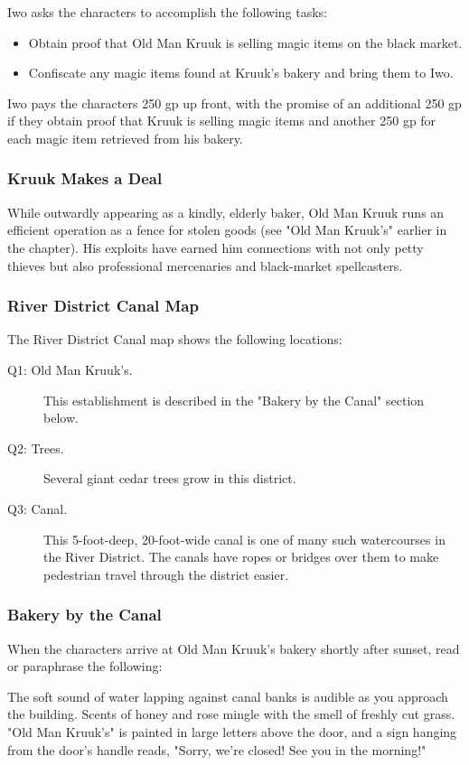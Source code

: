 \documentclass[10pt,a4paper,twoside,bg=print,twocolumn,openany,nodeprecatedcode]{dndbook}
\begin{document}
Iwo asks the characters to accomplish the following tasks:


\begin{itemize}
\item Obtain proof that Old Man Kruuk is selling magic items on the black market.
\item Confiscate any magic items found at Kruuk's bakery and bring them to Iwo.
\end{itemize}

Iwo pays the characters 250 gp up front, with the promise of an additional 250 gp if they obtain proof that Kruuk is selling magic items and another 250 gp for each magic item retrieved from his bakery.

\subsubsection{Kruuk Makes a Deal}
While outwardly appearing as a kindly, elderly baker, Old Man Kruuk runs an efficient operation as a fence for stolen goods (see "Old Man Kruuk's" earlier in the chapter). His exploits have earned him connections with not only petty thieves but also professional mercenaries and black-market spellcasters.

\subsubsection{River District Canal Map}
The River District Canal map shows the following locations:


\begin{description}
\item[Q1: Old Man Kruuk's.]
This establishment is described in the "Bakery by the Canal" section below.
\item[Q2: Trees.]
Several giant cedar trees grow in this district.
\item[Q3: Canal.]
This 5-foot-deep, 20-foot-wide canal is one of many such watercourses in the River District. The canals have ropes or bridges over them to make pedestrian travel through the district easier.
\end{description}

\subsubsection{Bakery by the Canal}
When the characters arrive at Old Man Kruuk's bakery shortly after sunset, read or paraphrase the following:

\begin{DndReadAloud}{}
The soft sound of water lapping against canal banks is audible as you approach the building. Scents of honey and rose mingle with the smell of freshly cut grass. "Old Man Kruuk's" is painted in large letters above the door, and a sign hanging from the door's handle reads, "Sorry, we're closed! See you in the morning!"

\end{DndReadAloud}
\end{document}
